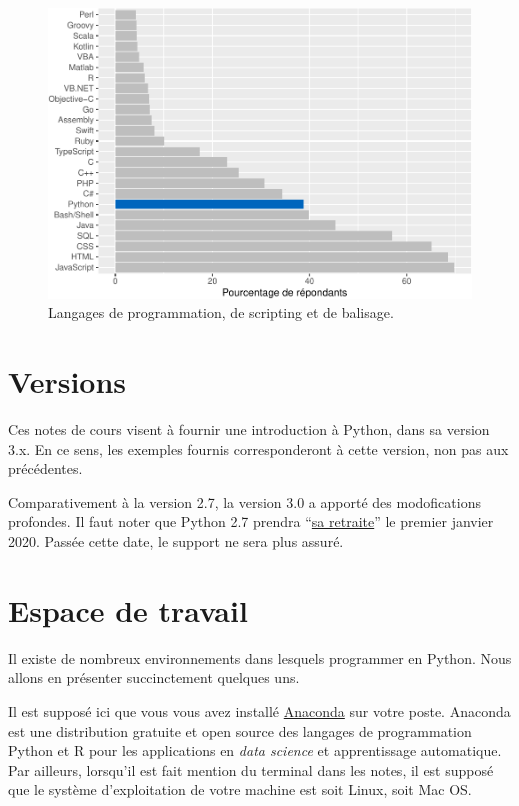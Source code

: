 \documentclass[12pt,]{book}
\numberwithin{equation}{section}
\numberwithin{countremarque}{section}
\begin{document}
\begin{figure}

{\centering \includegraphics{_main_files/figure-latex/intro-stack-langages-1} 

}

\caption{Langages de programmation, de scripting et de balisage.}\label{fig:intro-stack-langages}
\end{figure}

\section{Versions}\label{versions}

Ces notes de cours visent à fournir une introduction à Python, dans sa
version 3.x. En ce sens, les exemples fournis corresponderont à cette
version, non pas aux précédentes.

Comparativement à la version 2.7, la version 3.0 a apporté des
modofications profondes. Il faut noter que Python 2.7 prendra
``\href{https://pythonclock.org/}{sa retraite}'' le premier janvier
2020. Passée cette date, le support ne sera plus assuré.

\section{Espace de travail}\label{espace-de-travail}

Il existe de nombreux environnements dans lesquels programmer en Python.
Nous allons en présenter succinctement quelques uns.

Il est supposé ici que vous vous avez installé
\href{https://www.anaconda.com/}{Anaconda} sur votre poste. Anaconda est
une distribution gratuite et open source des langages de programmation
Python et R pour les applications en \emph{data science} et
apprentissage automatique. Par ailleurs, lorsqu'il est fait mention du
terminal dans les notes, il est supposé que le système d'exploitation de
votre machine est soit Linux, soit Mac OS.
\end{document}
